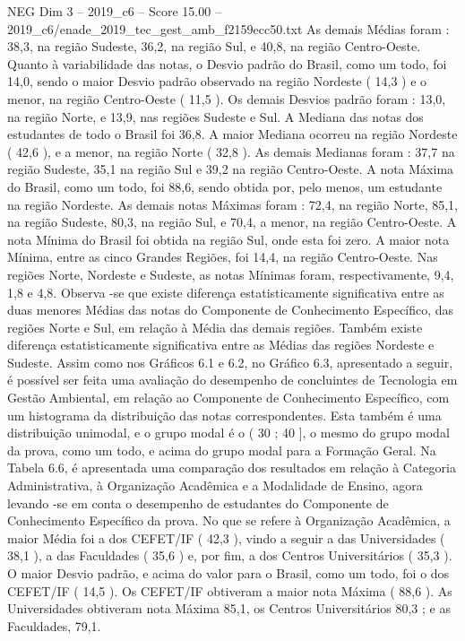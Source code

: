 \begin{textsample}{NEG Dim 3 – 2019\_c6 – Score 15.00 – 2019\_c6/enade\_2019\_tec\_gest\_amb\_f2159ecc50.txt}
As demais Médias foram : 38,3, na região Sudeste, 36,2, na região Sul, e 40,8, na região Centro-Oeste.
Quanto à variabilidade das notas, o Desvio padrão do Brasil, como um todo, foi 14,0, sendo o maior Desvio padrão observado na região Nordeste ( 14,3 ) e o menor, na região Centro-Oeste ( 11,5 ).
Os demais Desvios padrão foram : 13,0, na região Norte, e 13,9, nas regiões Sudeste e Sul.
A Mediana das notas dos estudantes de todo o Brasil foi 36,8.
A maior Mediana ocorreu na região Nordeste ( 42,6 ), e a menor, na região Norte ( 32,8 ).
As demais Medianas foram : 37,7 na região Sudeste, 35,1 na região Sul e 39,2 na região Centro-Oeste.
A nota Máxima do Brasil, como um todo, foi 88,6, sendo obtida por, pelo menos, um estudante na região Nordeste.
As demais notas Máximas foram : 72,4, na região Norte, 85,1, na região Sudeste, 80,3, na região Sul, e 70,4, a menor, na região Centro-Oeste.
A nota Mínima do Brasil foi obtida na região Sul, onde esta foi zero.
A maior nota Mínima, entre as cinco Grandes Regiões, foi 14,4, na região Centro-Oeste.
Nas regiões Norte, Nordeste e Sudeste, as notas Mínimas foram, respectivamente, 9,4, 1,8 e 4,8.
Observa -se que existe diferença estatisticamente significativa entre as duas menores Médias das notas do Componente de Conhecimento Específico, das regiões Norte e Sul, em relação à Média das demais regiões.
Também existe diferença estatisticamente significativa entre as Médias das regiões Nordeste e Sudeste.
Assim como nos Gráficos 6.1 e 6.2, no Gráfico 6.3, apresentado a seguir, é possível ser feita uma avaliação do desempenho de concluintes de Tecnologia em Gestão Ambiental, em relação ao Componente de Conhecimento Específico, com um histograma da distribuição das notas correspondentes.
Esta também é uma distribuição unimodal, e o grupo modal é o ( 30 ; 40 ], o mesmo do grupo modal da prova, como um todo, e acima do grupo modal para a Formação Geral.
Na Tabela 6.6, é apresentada uma comparação dos resultados em relação à Categoria Administrativa, à Organização Acadêmica e a Modalidade de Ensino, agora levando -se em conta o desempenho de estudantes do Componente de Conhecimento Específico da prova.
No que se refere à Organização Acadêmica, a maior Média foi a dos CEFET/IF ( 42,3 ), vindo a seguir a das Universidades ( 38,1 ), a das Faculdades ( 35,6 ) e, por fim, a dos Centros Universitários ( 35,3 ).
O maior Desvio padrão, e acima do valor para o Brasil, como um todo, foi o dos CEFET/IF ( 14,5 ).
Os CEFET/IF obtiveram a maior nota Máxima ( 88,6 ).
As Universidades obtiveram nota Máxima 85,1, os Centros Universitários 80,3 ; e as Faculdades, 79,1.

\end{textsample}
